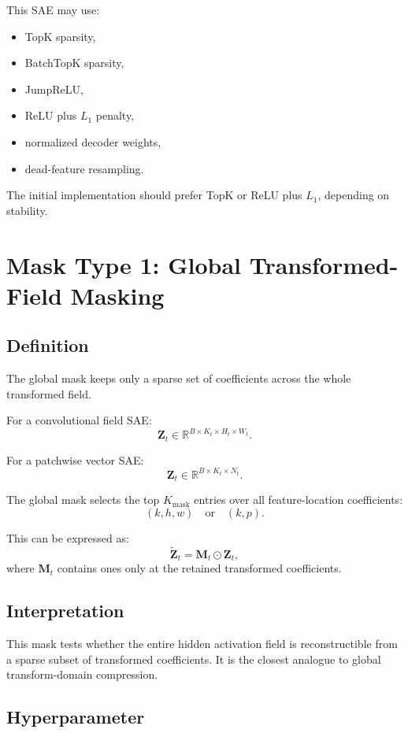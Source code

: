 \documentclass[11pt]{article}
\newcommand{\R}{\mathbb{R}}
\newcommand{\Ztens}{\mathbf{Z}}
\newcommand{\Mtens}{\mathbf{M}}
\newcommand{\Ztilde}{\widetilde{\mathbf{Z}}}
\begin{document}
This SAE may use:
\begin{itemize}[leftmargin=*]
    \item TopK sparsity,
    \item BatchTopK sparsity,
    \item JumpReLU,
    \item ReLU plus \(L_1\) penalty,
    \item normalized decoder weights,
    \item dead-feature resampling.
\end{itemize}

The initial implementation should prefer TopK or ReLU plus \(L_1\), depending on stability.

\section{Mask Type 1: Global Transformed-Field Masking}

\subsection{Definition}

The global mask keeps only a sparse set of coefficients across the whole transformed field.

For a convolutional field SAE:
\[
\Ztens_t \in \R^{B \times K_t \times H_t \times W_t}.
\]

For a patchwise vector SAE:
\[
\Ztens_t \in \R^{B \times K_t \times N_t}.
\]

The global mask selects the top \(K_{\text{mask}}\) entries over all feature-location coefficients:
\[
(k,h,w)
\quad\text{or}\quad
(k,p).
\]

This can be expressed as:
\[
\Ztilde_t = \Mtens_t \odot \Ztens_t,
\]
where \(\Mtens_t\) contains ones only at the retained transformed coefficients.

\subsection{Interpretation}

This mask tests whether the entire hidden activation field is reconstructible from a sparse subset of transformed coefficients. It is the closest analogue to global transform-domain compression.

\subsection{Hyperparameter}
\end{document}
